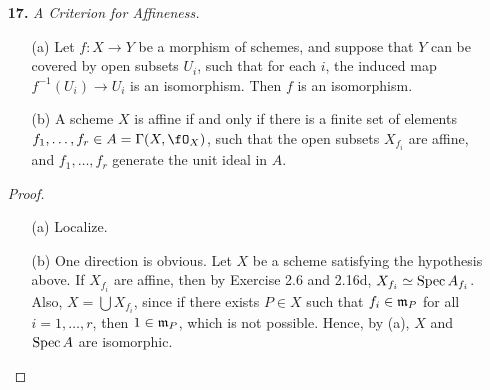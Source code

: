 \documentclass[a4paper]{article}
\begin{document}
\begin{enumerate} [label=\textbf{\arabic*.}, leftmargin=0em]
\begin{proof}
\begin{itemize} [leftmargin=0cm]
        \item[(c)] Let $X = \bigcup_{i = 1}^n U_i$, where $U_i = \spec{A_i}$, and let $X_{f, i} = X_f \cap U_i$. Assume $X_{f, i} \neq \emptyset$. We first show that for some $n_i > 0$, $f^{n_i} b_i$ is the restriction of an element of $\Gamma(U_i, \fO_X) = A_i$, where $b_i$ is the image of $b$ in $\Gamma(X_{f, i}, \fO_X)$. It is not hard to see that $\Gamma(X_{f, i}, \fO_X) = (A_i)_f$, so $b_i = b_i' / f^{n_i}$ for some $b_i' \in A_i$ and $n_i > 0$ (the case is trivial when $n_i = 0$), thus $f^{n_i} b_i$ is an element of $A_i$. Let $n = \max{\{n_i\}}$, then $f^n b_i$ is an element of $A_i$ for all $i$, and for all $i \neq j$, $f^n b_i$ and $f^n b_j$ restrict to the same element on $U_i \cap U_j$, so by part (b), there exists $n_{i, j} > 0$ such that $f^{n_{i, j}}(f^nb_i - f^n b_j) = 0$. Again, let $m = \max\{ n_{i, j} \}$, then $f^{m + n} b$ is the restriction of an element of $A$.

        \item[(d)] The element $f$ is clearly invertible in $\Gamma(X_f, \fO_X)$, so by part (c), every element of $\Gamma(X_f, \fO_X)$ is of the form $a / f^n$ for some $a \in A$ and $n \geq 0$.
    \end{itemize}
\end{proof}

\item[\textbf{17.}] \textit{A Criterion for Affineness.}
\begin{itemize}
    \item[(a)] Let $f : X \to Y$ be a morphism of schemes, and suppose that $Y$ can be covered by open subsets $U_i$, such that for each $i$, the induced map $f^{-1}(U_i) \to U_i$ is an isomorphism. Then $f$ is an isomorphism.
    \item[(b)] A scheme $X$ is affine if and only if there is a finite set of elements $f_1, \dots, f_r \in A = \Gamma(X, \fO_X)$, such that the open subsets $X_{f_i}$ are affine, and $f_1, \dots, f_r$ generate the unit ideal in $A$.
\end{itemize}

\begin{proof} $ $ \vspace{0pt}
   \begin{itemize} [leftmargin=0cm]
    \item[(a)] Localize.

    \item[(b)] One direction is obvious. Let $X$ be a scheme satisfying the hypothesis above. If $X_{f_i}$ are affine, then by Exercise 2.6 and 2.16d, $X_{f_i} \simeq \operatorname{Spec}{A_{f_i}}$. Also, $X = \bigcup X_{f_i}$, since if there exists $P \in X$ such that $f_i \in \mathfrak{m}_P$ for all $i = 1, \dots, r$, then $1 \in \mathfrak{m}_P$, which is not possible. Hence, by (a), $X$ and $\operatorname{Spec}{A}$ are isomorphic.
   \end{itemize}
\end{proof}


\end{enumerate}
\end{document}
